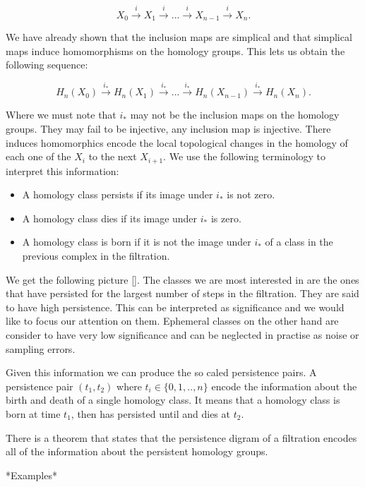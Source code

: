 $$ X_0 \overset{i}{\longrightarrow} X_1 \overset{i}{\longrightarrow} ... \overset{i}{\longrightarrow} X_{n-1} \overset{i}{\longrightarrow} X_n.$$

We have already shown that the inclusion maps are simplical and that simplical maps induce homomorphisms on the homology groups. This lets us obtain the following sequence:

$$ H_n(X_0) \overset{i_*}{\longrightarrow} H_n(X_1) \overset{i_*}{\longrightarrow} ... \overset{i_*}{\longrightarrow} H_n(X_{n-1}) \overset{i_*}{\longrightarrow} H_n(X_n).$$

Where we must note that $i_*$ may not be the inclusion maps on the homology groups. They may fail to be injective, any inclusion map is injective. There induces homomorphics encode the local topological changes in the homology of each one of the $X_i$ to the next $X_{i+1}$. We use the following terminology to interpret this information:

\begin{itemize}
    \item A homology class persists if its image under $i_*$ is not zero.
    \item A homology class dies if its image under $i_*$ is zero.
    \item A homology class is born if it is not the image under $i_*$ of a class in the previous complex in the filtration.
\end{itemize}

We get the following picture []. The classes we are most interested in are the ones that have persisted for the largest number of steps in the filtration. They are said to have high persistence. This can be interpreted as significance and we would like to focus our attention on them. Ephemeral classes on the other hand are consider to have very low significance and can be neglected in practise as noise or sampling errors.

Given this information we can produce the so caled persistence pairs. A persistence pair $(t_1, t_2)$ where $t_i \in \{0, 1, .., n\}$ encode the information about the birth and death of a single homology class. It means that a homology class is born at time $t_1$, then has persisted until and dies at $t_2$.

There is a theorem that states that the persistence digram of a filtration encodes all of the information about the persistent homology groups.

*Examples*

